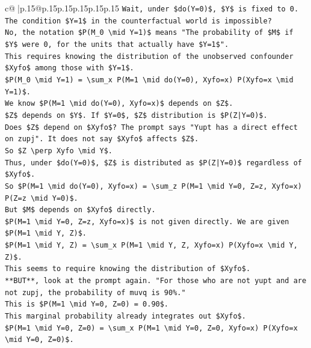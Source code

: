 \documentclass{article}
\begin{document}
{\begin{supertabular}{c@{$\;$}|p{.15\linewidth}@{}p{.15\linewidth}p{.15\linewidth}p{.15\linewidth}p{.15\linewidth}p{.15\linewidth}}
{{{\texttt{Wait, under \$do(Y=0)\$, \$Y\$ is fixed to 0. The condition \$Y=1\$ in the counterfactual world is impossible?} \\
\texttt{No, the notation \$P(M\_0 \textbackslash{}mid Y=1)\$ means "The probability of \$M\$ if \$Y\$ were 0, for the units that actually have \$Y=1\$".} \\
\texttt{This requires knowing the distribution of the unobserved confounder \$Xyfo\$ among those with \$Y=1\$.} \\
\texttt{\$P(M\_0 \textbackslash{}mid Y=1) = \textbackslash{}sum\_x P(M=1 \textbackslash{}mid do(Y=0), Xyfo=x) P(Xyfo=x \textbackslash{}mid Y=1)\$.} \\
\texttt{We know \$P(M=1 \textbackslash{}mid do(Y=0), Xyfo=x)\$ depends on \$Z\$.} \\
\texttt{\$Z\$ depends on \$Y\$. If \$Y=0\$, \$Z\$ distribution is \$P(Z|Y=0)\$.} \\
\texttt{Does \$Z\$ depend on \$Xyfo\$? The prompt says "Yupt has a direct effect on zupj". It does not say \$Xyfo\$ affects \$Z\$.} \\
\texttt{So \$Z \textbackslash{}perp Xyfo \textbackslash{}mid Y\$.} \\
\texttt{Thus, under \$do(Y=0)\$, \$Z\$ is distributed as \$P(Z|Y=0)\$ regardless of \$Xyfo\$.} \\
\texttt{So \$P(M=1 \textbackslash{}mid do(Y=0), Xyfo=x) = \textbackslash{}sum\_z P(M=1 \textbackslash{}mid Y=0, Z=z, Xyfo=x) P(Z=z \textbackslash{}mid Y=0)\$.} \\
\texttt{But \$M\$ depends on \$Xyfo\$ directly.} \\
\texttt{\$P(M=1 \textbackslash{}mid Y=0, Z=z, Xyfo=x)\$ is not given directly. We are given \$P(M=1 \textbackslash{}mid Y, Z)\$.} \\
\texttt{\$P(M=1 \textbackslash{}mid Y, Z) = \textbackslash{}sum\_x P(M=1 \textbackslash{}mid Y, Z, Xyfo=x) P(Xyfo=x \textbackslash{}mid Y, Z)\$.} \\
\texttt{This seems to require knowing the distribution of \$Xyfo\$.} \\
\texttt{**BUT**, look at the prompt again. "For those who are not yupt and are not zupj, the probability of muvq is 90\%."} \\
\texttt{This is \$P(M=1 \textbackslash{}mid Y=0, Z=0) = 0.90\$.} \\
\texttt{This marginal probability already integrates out \$Xyfo\$.} \\
\texttt{\$P(M=1 \textbackslash{}mid Y=0, Z=0) = \textbackslash{}sum\_x P(M=1 \textbackslash{}mid Y=0, Z=0, Xyfo=x) P(Xyfo=x \textbackslash{}mid Y=0, Z=0)\$.} \\
}}}
\end{supertabular}}
\end{document}
